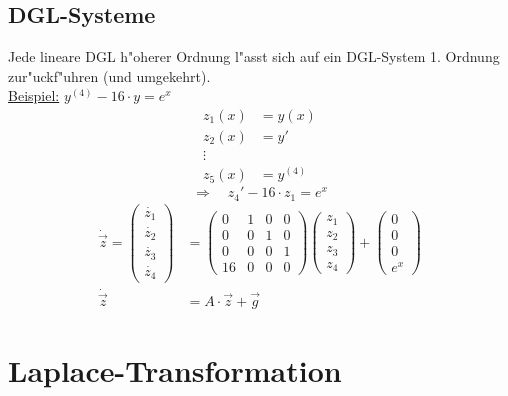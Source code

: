 \subsection{DGL-Systeme}
Jede lineare DGL h"oherer Ordnung l"asst sich auf ein DGL-System 1. Ordnung zur"uckf"uhren
(und umgekehrt). \\
\underline{Beispiel:} $y^{(4)}-16\cdot y=e^x$ \\
\begin{align*}
	z_1(x) &= y(x) \\
	z_2(x) &= y' \\
	\vdots \\
	z_5(x) &= y^{(4)}
\end{align*}
\begin{equation*}
	\Longrightarrow\quad z_4' -16\cdot z_1=e^x
\end{equation*}
\begin{align*}
	\dot{\overrightarrow{z}}=
	\begin{pmatrix}\dot{z_1} \\ \dot{z_2} \\ \dot{z_3} \\ \dot{z_4}\end{pmatrix} &=
	\begin{pmatrix}
		0  & 1 & 0 & 0 \\
		0  & 0 & 1 & 0 \\
		0  & 0 & 0 & 1 \\
		16 & 0 & 0 & 0
	\end{pmatrix}
	\begin{pmatrix}z_1 \\ z_2 \\ z_3 \\ z_4	\end{pmatrix}+
	\begin{pmatrix}0 \\ 0 \\ 0 \\ e^x\end{pmatrix} \\
	\dot{\overrightarrow{z}} &= A \cdot \overrightarrow{z} + \overrightarrow{g}
\end{align*}

\section{Laplace-Transformation}
